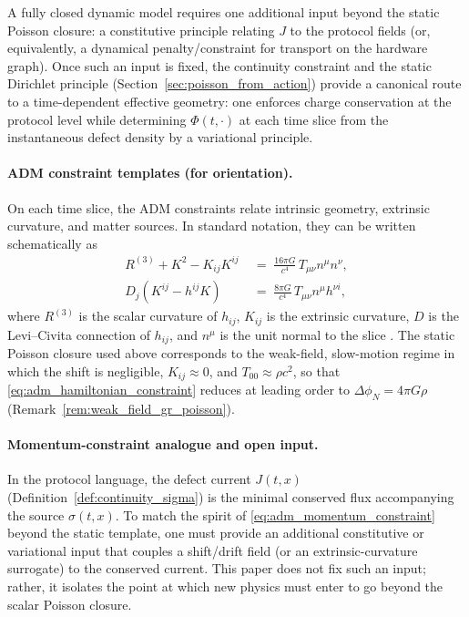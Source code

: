 A fully closed dynamic model requires one additional input beyond the static Poisson closure: a constitutive principle relating $J$ to the protocol fields (or, equivalently, a dynamical penalty/constraint for transport on the hardware graph).
Once such an input is fixed, the continuity constraint and the static Dirichlet principle (Section~\ref{sec:poisson_from_action}) provide a canonical route to a time-dependent effective geometry: one enforces charge conservation at the protocol level while determining $\Phi(t,\cdot)$ at each time slice from the instantaneous defect density by a variational principle.

\paragraph{ADM constraint templates (for orientation).}
On each time slice, the ADM constraints relate intrinsic geometry, extrinsic curvature, and matter sources.
In standard notation, they can be written schematically as
\begin{align}
R^{(3)}+K^2-K_{ij}K^{ij} \;&=\; \frac{16\pi G}{c^4}\,T_{\mu\nu}n^\mu n^\nu,
\label{eq:adm_hamiltonian_constraint}\\
D_j\!\left(K^{ij}-h^{ij}K\right) \;&=\; \frac{8\pi G}{c^4}\,T_{\mu\nu}n^\mu h^{\nu i},
\label{eq:adm_momentum_constraint}
\end{align}
where $R^{(3)}$ is the scalar curvature of $h_{ij}$, $K_{ij}$ is the extrinsic curvature, $D$ is the Levi--Civita connection of $h_{ij}$, and $n^\mu$ is the unit normal to the slice \cite{MisnerThorneWheeler1973,Wald1984,Carroll2004}.
The static Poisson closure used above corresponds to the weak-field, slow-motion regime in which the shift is negligible, $K_{ij}\approx 0$, and $T_{00}\approx \rho c^2$, so that \eqref{eq:adm_hamiltonian_constraint} reduces at leading order to $\Delta\phi_N=4\pi G\rho$ (Remark~\ref{rem:weak_field_gr_poisson}).

\paragraph{Momentum-constraint analogue and open input.}
In the protocol language, the defect current $J(t,x)$ (Definition~\ref{def:continuity_sigma}) is the minimal conserved flux accompanying the source $\sigma(t,x)$.
To match the spirit of \eqref{eq:adm_momentum_constraint} beyond the static template, one must provide an additional constitutive or variational input that couples a shift/drift field (or an extrinsic-curvature surrogate) to the conserved current.
This paper does not fix such an input; rather, it isolates the point at which new physics must enter to go beyond the scalar Poisson closure.

